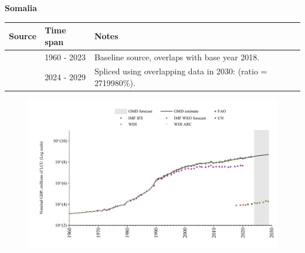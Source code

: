 \documentclass[12pt,a4paper,landscape]{article}
\begin{document}
\begin{adjustbox}{max totalsize={\paperwidth}{\paperheight},center}
\begin{minipage}[t][\textheight][t]{\textwidth}
\vspace*{0.5cm}
{}
\begin{center}
{\Large\bfseries Somalia}
\end{center}
\vspace{0.5cm}
\begin{table}[H]
\centering
\small
\begin{tabular}{|l|l|l|}
\hline
\textbf{Source} & \textbf{Time span} & \textbf{Notes} \\
\hline
\rowcolor{white}\cite{WDI}& 1960 - 2023 &Baseline source, overlaps with base year 2018.\\
\rowcolor{lightgray}\cite{IMF_WEO_forecast}& 2024 - 2029 &Spliced using overlapping data in 2030: (ratio = 2719980\%).\\
\hline
\end{tabular}
\end{table}
\begin{figure}[H]
\centering
\includegraphics[width=\textwidth,height=0.6\textheight,keepaspectratio]{graphs/SOM_nGDP.pdf}
\end{figure}
\end{minipage}
\end{adjustbox}
\end{document}
